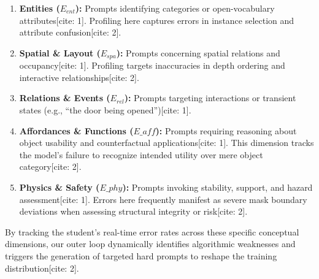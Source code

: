 \begin{enumerate}
    \item \textbf{Entities ($E_{ent}$):} Prompts identifying categories or open-vocabulary attributes[cite: 1]. Profiling here captures errors in instance selection and attribute confusion[cite: 2].
    \item \textbf{Spatial \& Layout ($E_{spa}$):} Prompts concerning spatial relations and occupancy[cite: 1]. Profiling targets inaccuracies in depth ordering and interactive relationships[cite: 2].
    \item \textbf{Relations \& Events ($E_{rel}$):} Prompts targeting interactions or transient states (e.g., ``the door being opened'')[cite: 1]. 
    \item \textbf{Affordances \& Functions ($E\_{aff}$):} Prompts requiring reasoning about object usability and counterfactual applications[cite: 1]. This dimension tracks the model's failure to recognize intended utility over mere object category[cite: 2].
    \item \textbf{Physics \& Safety ($E\_{phy}$):} Prompts invoking stability, support, and hazard assessment[cite: 1]. Errors here frequently manifest as severe mask boundary deviations when assessing structural integrity or risk[cite: 2].
\end{enumerate}

By tracking the student's real-time error rates across these specific conceptual dimensions, our outer loop dynamically identifies algorithmic weaknesses and triggers the generation of targeted hard prompts to reshape the training distribution[cite: 2].